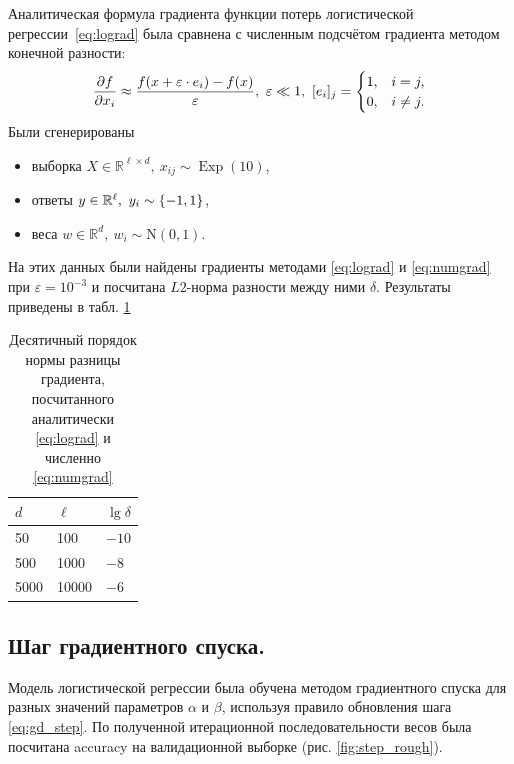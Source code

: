 \documentclass[12pt]{extarticle}
\newcommand{\R}{\mathbb{R}}
\newcommand{\eps}{\varepsilon}
\let\U\relax
\DeclareMathOperator{\U}{\text{Uniform}}
\DeclareMathOperator{\Exp}{\text{Exp}}
\begin{document}
Аналитическая формула градиента функции потерь логистической регрессии~\eqref{eq:lograd} была сравнена с численным подсчётом градиента методом конечной разности:
\begin{equation}\label{eq:numgrad}
    {\partial f\over\partial x_i}\approx{f(x+\eps\cdot e_i)-f(x)\over\eps},\ \eps\ll1,\ [e_i]_j=
    \begin{cases}
    1, & i=j,\\
    0, & i\neq j.
    \end{cases}
\end{equation}
Были сгенерированы
\begin{itemize}
    \item выборка $X\in\R^{\ell\times d},\ x_{ij}\sim\Exp(10)$,
    \item ответы $y\in\R^\ell,\ y_i\sim\U\{-1,1\}$,
    \item веса $w\in\R^d,\ w_i\sim\text{N}(0,1)$.
\end{itemize}
На этих данных были найдены градиенты методами \eqref{eq:lograd} и \eqref{eq:numgrad} при $\eps=10^{-3}$ и посчитана $L2$-норма разности между ними $\delta$. Результаты приведены в табл. \ref{tbl:numanal}

\begin{table}[!hbt]
    \centering
    \begin{tabular}{l|l|l}
        $d$ & $\ell$ & $\lg\delta$ \\
        \hline
        50 & 100    & $-10$ \\
        500 & 1000  & $-8$ \\
        5000 & 10000& $-6$ \\
    \end{tabular}
    \caption{Десятичный порядок нормы разницы градиента, посчитанного аналитически \eqref{eq:lograd} и численно \eqref{eq:numgrad}}
    \label{tbl:numanal}
\end{table}

\subsection{Шаг градиентного спуска.}\label{sec:gd_step}

Модель логистической регрессии была обучена методом градиентного спуска для разных значений параметров $\alpha$ и $\beta$, используя правило обновления шага \eqref{eq:gd_step}. По полученной итерационной последовательности весов была посчитана accuracy на валидационной выборке (рис. \ref{fig:step_rough}).
\end{document}
